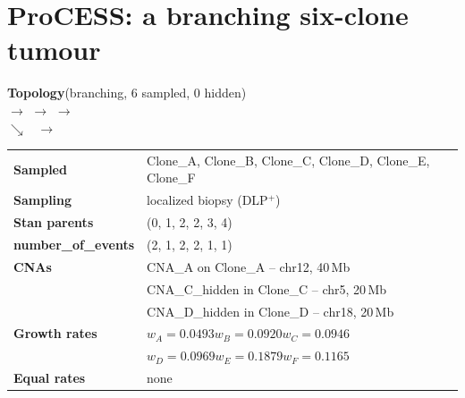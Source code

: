 \section{ProCESS: a branching six-clone tumour}
\begin{tcolorbox}[
  colback=white, colframe=procblue, boxrule=0.5pt, arc=2pt,
  before skip=2pt, after skip=4pt,
  top=0pt, bottom=3pt, left=4pt, right=4pt,
  boxsep=1pt,
  toptitle=2pt, bottomtitle=2pt,
  coltitle=white, colbacktitle=procblue, fonttitle=\bfseries\large,
  title={Branching tree (6 clones) \hfill \normalfont\normalsize Nnodes=6 \ \textbar\ Nevents=9 \ \textbar\ Nequations=12}
]
\begin{tcolorbox}[colback=white, colframe=procblue!55, boxrule=0.4pt, arc=1pt,
  before skip=0pt, after skip=4pt, left=3pt, right=3pt, top=3pt, bottom=3pt]
\textbf{Topology}\quad (branching, 6 sampled, 0 hidden)\\[4pt]
 $\longrightarrow$  $\longrightarrow$  $\longrightarrow$ \\[2pt]
$\searrow$\  $\longrightarrow$ 
\end{tcolorbox}
\vspace{2pt}
\begin{tabular}{@{}ll@{}}
\toprule
\textbf{Sampled}            & Clone\_A, Clone\_B, Clone\_C, Clone\_D, Clone\_E, Clone\_F \\
\textbf{Sampling}           & localized biopsy (DLP$^+$) \\
\textbf{Stan parents}       & (0, 1, 2, 2, 3, 4) \\
\textbf{number\_of\_events} & (2, 1, 2, 2, 1, 1) \\
\midrule
\textbf{CNAs}               & CNA\_A on Clone\_A -- chr12, 40\,Mb \\
                            & CNA\_C\_hidden in Clone\_C -- chr5, 20\,Mb \\
                            & CNA\_D\_hidden in Clone\_D -- chr18, 20\,Mb \\
\midrule
\textbf{Growth rates}       & $w_A{=}0.0493$\quad $w_B{=}0.0920$\quad $w_C{=}0.0946$ \\
                            & $w_D{=}0.0969$\quad $w_E{=}0.1879$\quad $w_F{=}0.1165$ \\
\textbf{Equal rates}        & none \\
\bottomrule
\end{tabular}
\end{tcolorbox}


